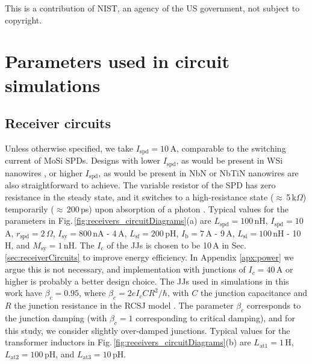 \documentclass[twocolumn]{article}
\begin{document}
\vspace{0.5em}
This is a contribution of NIST, an agency of the US government, not subject to copyright.
	
\newpage
\appendix
	
\section{\label{apx:circuitParameters}Parameters used in circuit simulations}
\subsection{Receiver circuits}
Unless otherwise specified, we take $I_{\mathrm{spd}} = 10$\,\textmu A, comparable to the switching current of MoSi \cite{veko2015} SPDs. Designs with lower $I_{\mathrm{spd}}$, as would be present in WSi nanowires \cite{mave2013}, or higher $I_{\mathrm{spd}}$, as would be present in NbN \cite{gook2001} or NbTiN \cite{miya2013} nanowires are also straightforward to achieve. The variable resistor of the SPD has zero resistance in the steady state, and it switches to a high-resistance state ($\approx$\,5\,k$\Omega$) temporarily ($\approx$\,200\,ps) upon absorption of a photon \cite{yake2007}. Typical values for the parameters in Fig.\,\ref{fig:receivers_circuitDiagrams}(a) are $L_{\mathrm{spd}} = 100$\,nH, $I_{\mathrm{spd}} = 10$\,\textmu A, $r_{\mathrm{spd}} = 2$\,$\Omega$, $I_{\mathrm{sy}} = 800$\,nA -  4\,\textmu A, $L_{\mathrm{sf}} = 200$\,pH, $I_{\mathrm{b}} = 7$\,\textmu A - 9\,\textmu A, $L_{\mathrm{si}} = 100$\,nH - 10\,\textmu H, and $M_{\mathrm{sy}} = 1$\,nH. The $I_{\mathrm{c}}$ of the JJs is chosen to be 10\,\textmu A in Sec.\,\ref{sec:receiverCircuits} to improve energy efficiency. In Appendix \ref{apx:power} we argue this is not necessary, and implementation with junctions of $I_c = 40$\,\textmu A or higher is probably a better design choice. The JJs used in simulations in this work have $\beta_c = 0.95$, where $\beta_c = 2eI_cCR^2/\hbar$, with $C$ the junction capacitance and $R$ the junction resistance in the RCSJ model \cite{vatu1998,ka1999}. The parameter $\beta_c$ corresponds to the junction damping (with $\beta_c = 1$ corresponding to critical damping), and for this study, we consider slightly over-damped junctions. Typical values for the transformer inductors in Fig.\,\ref{fig:receivers_circuitDiagrams}(b) are $L_{\mathrm{at1}} = 1$\,\textmu H, $L_{\mathrm{at2}} = 100$\,pH, and $L_{\mathrm{at3}} = 10$\,pH.
\end{document}
